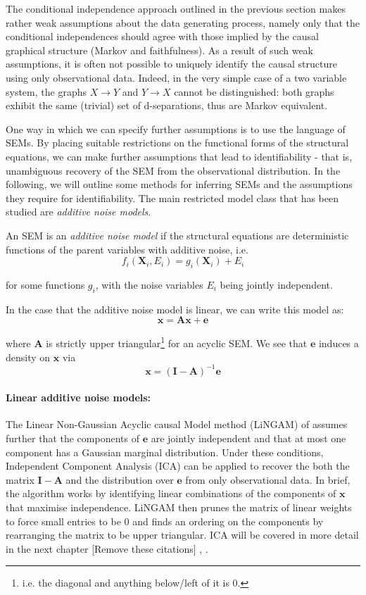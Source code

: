 The conditional independence approach outlined in the previous section makes rather weak assumptions about the data generating process, namely only that the conditional independences should agree with those implied by the causal graphical structure (Markov and faithfulness). 
As a result of such weak assumptions, it is often not possible to uniquely identify the causal structure using only observational data. 
Indeed, in the very simple case of a two variable system, the graphs $X \rightarrow Y$ and $Y \rightarrow X$ cannot be distinguished:
both graphs exhibit the same (trivial) set of d-separations, thus are Markov equivalent. 

One way in which we can specify further assumptions is to use the language of SEMs. 
By placing suitable restrictions on the functional forms of the structural equations, we can make further assumptions that lead to identifiability - that is, unambiguous recovery of the SEM from the observational distribution. In the following, we will outline some methods for inferring SEMs and the assumptions they require for identifiability. 
The main restricted model class that has been studied are \emph{additive noise models}.

\begin{definition}
	An SEM is an \emph{additive noise model} if the structural equations are deterministic functions of the parent variables with additive noise, i.e.
	\[f_i(\mathbf{X}_i,E_i) = g_i(\mathbf{X}_i) + E_i \]
	
	for some functions $g_i$, with the noise variables $E_i$ being jointly independent.
\end{definition}

In the case that the additive noise model is linear, we can write this model as:
\[ \mathbf{x} = \mathbf{A}\mathbf{x} + \mathbf{e} \]

where $\mathbf{A}$ is strictly upper triangular\footnote{i.e. the diagonal and anything below/left of it is 0.} for an acyclic SEM. 
We see that $\mathbf{e}$ induces a density on $\mathbf{x}$ via
\[\mathbf{x} = (\mathbf{I}-\mathbf{A})^{-1} \mathbf{e}\]

\paragraph{Linear additive noise models:}
The Linear Non-Gaussian Acyclic causal Model method (LiNGAM) of \cite{shimizu2006linear} assumes further that the components of $\mathbf{e}$ are jointly independent and that at most one component has a Gaussian marginal distribution. 
Under these conditions, Independent Component Analysis (ICA) can be applied to recover the both the matrix $\mathbf{I}-\mathbf{A}$ and the distribution over $\mathbf{e}$ from only observational data.
In brief, the algorithm works by identifying linear combinations of the components of $\mathbf{x}$ that maximise independence. 
LiNGAM then prunes the matrix of linear weights to force small entries to be 0 and finds an ordering on the components by rearranging the matrix to be upper triangular. 
ICA will be covered in more detail in the next chapter 
[Remove these citations] \cite{hyvarinen2000independent},  \cite{comon1994independent}.

